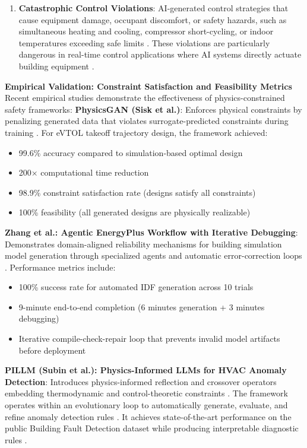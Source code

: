 \documentclass[12pt,a4paper]{article}
\begin{document}
\begin{enumerate}[resume]
  \item \textbf{Catastrophic Control Violations}: AI-generated control strategies that cause equipment damage, occupant discomfort, or safety hazards, such as simultaneous heating and cooling, compressor short-cycling, or indoor temperatures exceeding safe limits \cite{ref56}. These violations are particularly dangerous in real-time control applications where AI systems directly actuate building equipment \cite{ref195}.
\end{enumerate}
\textbf{Empirical Validation: Constraint Satisfaction and Feasibility Metrics}
Recent empirical studies demonstrate the effectiveness of physics-constrained safety frameworks:
\textbf{PhysicsGAN (Sisk et al.)}: Enforces physical constraints by penalizing generated data that violates surrogate-predicted constraints during training \cite{ref52}. For eVTOL takeoff trajectory design, the framework achieved:
\begin{itemize}
  \item 99.6\% accuracy compared to simulation-based optimal design \cite{ref52}
  \item 200× computational time reduction \cite{ref52}
  \item 98.9\% constraint satisfaction rate (designs satisfy all constraints) \cite{ref52}
  \item 100\% feasibility (all generated designs are physically realizable) \cite{ref52}
\end{itemize}
\textbf{Zhang et al.: Agentic EnergyPlus Workflow with Iterative Debugging}: Demonstrates domain-aligned reliability mechanisms for building simulation model generation through specialized agents and automatic error-correction loops \cite{ref123}. Performance metrics include:
\begin{itemize}
  \item 100\% success rate for automated IDF generation across 10 trials \cite{ref123}
  \item 9-minute end-to-end completion (6 minutes generation + 3 minutes debugging) \cite{ref123}
  \item Iterative compile-check-repair loop that prevents invalid model artifacts before deployment \cite{ref123}
\end{itemize}
\textbf{PILLM (Subin et al.): Physics-Informed LLMs for HVAC Anomaly Detection}: Introduces physics-informed reflection and crossover operators embedding thermodynamic and control-theoretic constraints \cite{ref56}. The framework operates within an evolutionary loop to automatically generate, evaluate, and refine anomaly detection rules \cite{ref56}. It achieves state-of-the-art performance on the public Building Fault Detection dataset while producing interpretable diagnostic rules \cite{ref56}.
\end{document}
